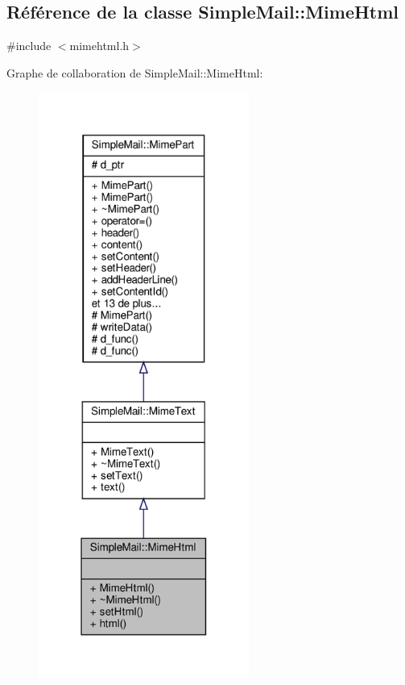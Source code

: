 \hypertarget{class_simple_mail_1_1_mime_html}{}\subsection{Référence de la classe Simple\+Mail\+:\+:Mime\+Html}
\label{class_simple_mail_1_1_mime_html}


{\ttfamily \#include $<$mimehtml.\+h$>$}



Graphe de collaboration de Simple\+Mail\+:\+:Mime\+Html\+:\nopagebreak
\begin{figure}[H]
\begin{center}
\leavevmode
\includegraphics[width=196pt]{class_simple_mail_1_1_mime_html__coll__graph}
\end{center}
\end{figure}
